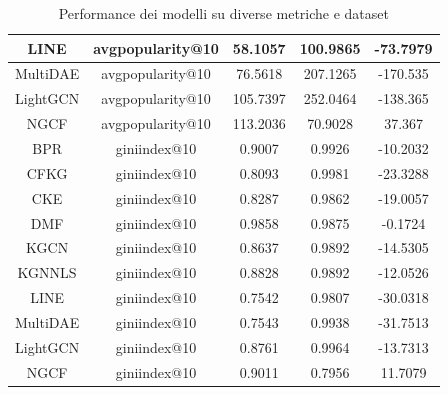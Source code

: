 \begin{table}[H]
{\begin{tabular}{|c|c|c|c|c|}
    LINE             & avgpopularity@10 & 58.1057                       & 100.9865                        & -73.7979                              \\ \hline
    MultiDAE         & avgpopularity@10 & 76.5618                       & 207.1265                        & -170.535                              \\ \hline
    LightGCN         & avgpopularity@10 & 105.7397                      & 252.0464                        & -138.365                              \\ \hline
    NGCF             & avgpopularity@10 & 113.2036                      & 70.9028                         & 37.367                                \\ \hline
    BPR              & giniindex@10     & 0.9007                        & 0.9926                          & -10.2032                              \\ \hline
    CFKG             & giniindex@10     & 0.8093                        & 0.9981                          & -23.3288                              \\ \hline
    CKE              & giniindex@10     & 0.8287                        & 0.9862                          & -19.0057                              \\ \hline
    DMF              & giniindex@10     & 0.9858                        & 0.9875                          & -0.1724                               \\ \hline
    KGCN             & giniindex@10     & 0.8637                        & 0.9892                          & -14.5305                              \\ \hline
    KGNNLS           & giniindex@10     & 0.8828                        & 0.9892                          & -12.0526                              \\ \hline
    LINE             & giniindex@10     & 0.7542                        & 0.9807                          & -30.0318                              \\ \hline
    MultiDAE         & giniindex@10     & 0.7543                        & 0.9938                          & -31.7513                              \\ \hline
    LightGCN         & giniindex@10     & 0.8761                        & 0.9964                          & -13.7313                              \\ \hline
    NGCF             & giniindex@10     & 0.9011                        & 0.7956                          & 11.7079                               \\ \hline
    \end{tabular}
    }
    \caption{Performance dei modelli su diverse metriche e dataset}
    \end{table}


